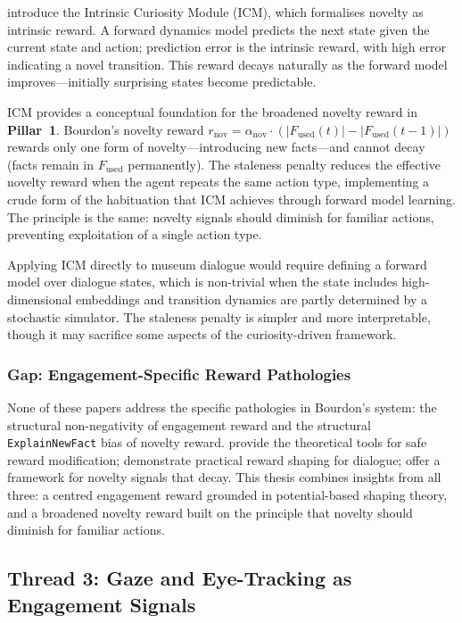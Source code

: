 \documentclass[a4paper, 11pt]{article}
\newcommand{\rnov}{r_{\mathrm{nov}}}
\newcommand{\Fused}{F_{\mathrm{used}}}
\newcommand{\pillar}[1]{\textbf{Pillar~#1}}
\begin{document}
\citet{pathak2017curiosity} introduce the Intrinsic Curiosity Module (ICM), which formalises novelty as intrinsic reward. A forward dynamics model predicts the next state given the current state and action; prediction error is the intrinsic reward, with high error indicating a novel transition. This reward decays naturally as the forward model improves---initially surprising states become predictable.

ICM provides a conceptual foundation for the broadened novelty reward in \pillar{1}. Bourdon's novelty reward $\rnov = \alpha_{\mathrm{nov}} \cdot (|\Fused(t)| - |\Fused(t-1)|)$ rewards only one form of novelty---introducing new facts---and cannot decay (facts remain in $\Fused$ permanently). The staleness penalty reduces the effective novelty reward when the agent repeats the same action type, implementing a crude form of the habituation that ICM achieves through forward model learning. The principle is the same: novelty signals should diminish for familiar actions, preventing exploitation of a single action type.

Applying ICM directly to museum dialogue would require defining a forward model over dialogue states, which is non-trivial when the state includes high-dimensional embeddings and transition dynamics are partly determined by a stochastic simulator. The staleness penalty is simpler and more interpretable, though it may sacrifice some aspects of the curiosity-driven framework.

\subsubsection{Gap: Engagement-Specific Reward Pathologies}

None of these papers address the specific pathologies in Bourdon's system: the structural non-negativity of engagement reward and the structural \texttt{ExplainNewFact} bias of novelty reward. \citet{ng1999policy} provide the theoretical tools for safe reward modification; \citet{su2015reward} demonstrate practical reward shaping for dialogue; \citet{pathak2017curiosity} offer a framework for novelty signals that decay. This thesis combines insights from all three: a centred engagement reward grounded in potential-based shaping theory, and a broadened novelty reward built on the principle that novelty should diminish for familiar actions.

\subsection{Thread 3: Gaze and Eye-Tracking as Engagement Signals}
\label{sec:lit_gaze}
\end{document}
